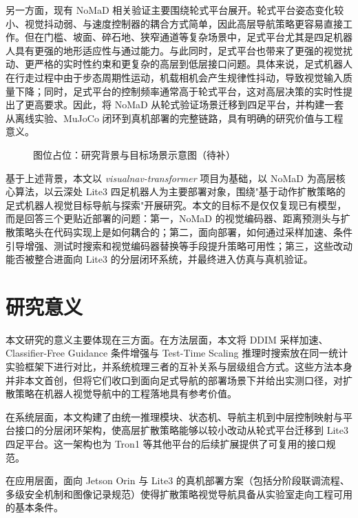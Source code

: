 另一方面，现有 NoMaD 相关验证主要围绕轮式平台展开。轮式平台姿态变化较小、视觉抖动弱、与速度控制器的耦合方式简单，因此高层导航策略更容易直接工作。但在门槛、坡面、碎石地、狭窄通道等复杂场景中，足式平台尤其是四足机器人具有更强的地形适应性与通过能力。与此同时，足式平台也带来了更强的视觉扰动、更严格的实时性约束和更复杂的高层到低层接口问题\cite{hwangbo2019anymal,lee2020learning}。具体来说，足式机器人在行走过程中由于步态周期性运动，机载相机会产生规律性抖动，导致视觉输入质量下降；同时，足式平台的控制频率通常高于轮式平台，这对高层决策的实时性提出了更高要求。因此，将 NoMaD 从轮式验证场景迁移到四足平台，并构建一套从离线实验、MuJoCo 闭环到真机部署的完整链路，具有明确的研究价值与工程意义。

\begin{figure}[htbp]
    \centering
    \fbox{\rule{0pt}{55mm}\rule{0.86\linewidth}{0pt}}
    \caption{图位占位：研究背景与目标场景示意图（待补）}
    \label{fig:intro-background-placeholder}
\end{figure}

基于上述背景，本文以 \textit{visualnav-transformer} 项目为基础，以 NoMaD 为高层核心算法，以云深处 Lite3 四足机器人为主要部署对象，围绕"基于动作扩散策略的足式机器人视觉目标导航与探索"开展研究。本文的目标不是仅仅复现已有模型，而是回答三个更贴近部署的问题：第一，NoMaD 的视觉编码器、距离预测头与扩散策略头在代码实现上是如何耦合的；第二，面向部署，如何通过采样加速、条件引导增强、测试时搜索和视觉编码器替换等手段提升策略可用性；第三，这些改动能否被整合进面向 Lite3 的分层闭环系统，并最终进入仿真与真机验证。

\section{研究意义}

本文研究的意义主要体现在三方面。在方法层面，本文将 DDIM 采样加速、Classifier-Free Guidance 条件增强与 Test-Time Scaling 推理时搜索放在同一统计实验框架下进行对比，并系统梳理三者的互补关系与层级组合方式。这些方法本身并非本文首创，但将它们收口到面向足式导航的部署场景下并给出实测口径，对扩散策略在机器人视觉导航中的工程落地具有参考价值。

在系统层面，本文构建了由统一推理模块、状态机、导航主机到中层控制映射与平台接口的分层闭环架构，使高层扩散策略能够以较小改动从轮式平台迁移到 Lite3 四足平台。这一架构也为 Tron1 等其他平台的后续扩展提供了可复用的接口规范。

在应用层面，面向 Jetson Orin 与 Lite3 的真机部署方案（包括分阶段联调流程、多级安全机制和图像记录规范）使得扩散策略视觉导航具备从实验室走向工程可用的基本条件。

